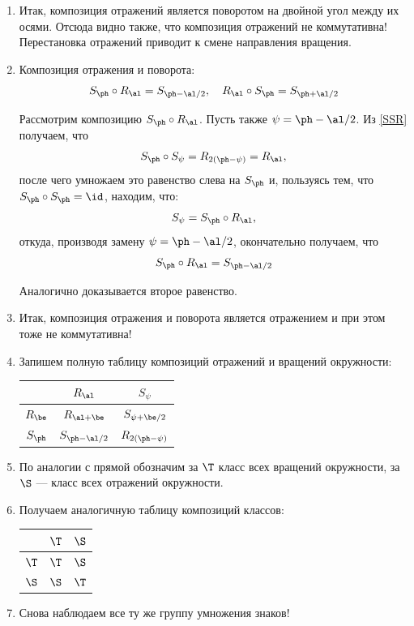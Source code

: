 \begin{enumerate}
\item Итак, композиция отражений является поворотом на двойной угол между их осями. Отсюда видно также, что композиция отражений не коммутативна! Перестановка отражений приводит к смене направления вращения.
\item Композиция отражения и поворота:
\begin{equation}\label{SRS}
S_\ph\circ R_\al = S_{\ph-\al/2},\quad R_\al\circ S_\ph = S_{\ph+\al/2}
\end{equation}

Рассмотрим композицию $S_\ph\circ R_\al$. Пусть также $\psi = \ph-\al/2$.
Из \eqref{SSR} получаем, что
$$
S_\ph\circ S_\psi = R_{2(\ph-\psi)}=R_\al,
$$
после чего умножаем это равенство слева на $S_\ph$ и, пользуясь тем, что $S_\ph\circ S_\ph=\id$, находим, что:
$$
S_\psi = S_\ph\circ R_\al,
$$
откуда, производя замену $\psi=\ph-\al/2$, окончательно получаем, что
$$
S_\ph\circ R_\al = S_{\ph-\al/2}
$$

Аналогично доказывается второе равенство.
\item Итак, композиция отражения и поворота является отражением и при этом тоже не коммутативна!
\item Запишем полную таблицу композиций отражений и вращений окружности:
\begin{center}
\begin{tabular}{c|c|c|}
  & $R_\al$ & $S_\psi$ \\
 \hline
$R_\be$ & $R_{\al+\be}$ & $S_{\psi+\be/2}$ \\
 \hline
$S_\ph$ & $S_{\ph-\al/2}$ & $R_{2(\ph-\psi)}$ \\
\hline
\end{tabular}
\end{center}
\item По аналогии с прямой обозначим за $\T$ класс всех вращений окружности, за $\S$ --- класс всех отражений окружности.
\item Получаем аналогичную таблицу композиций классов:
\begin{center}
\begin{tabular}{c|c|c|}
  & $\T$ & $\S$ \\
 \hline
$\T$ & $\T$ & $\S$ \\
 \hline
$\S$ & $\S$ & $\T$ \\
\hline
\end{tabular}
\end{center}

\item Снова наблюдаем все ту же группу умножения знаков!



\end{enumerate}
